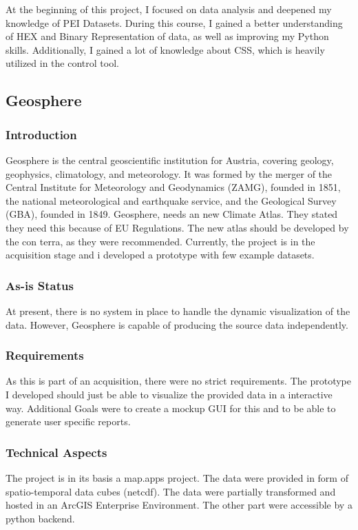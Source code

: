 \documentclass[11pt, titlepage, a4paper]{article}
\begin{document}
At the beginning of this project, I focused on data analysis and deepened my knowledge of PEI Datasets. During this course, I gained a better understanding of HEX and Binary Representation of data, as well as improving my Python skills.  Additionally, I gained a lot of knowledge about CSS, which is heavily utilized in the control tool.%

\subsection{Geosphere}
\subsubsection{Introduction}
Geosphere is the central geoscientific institution for Austria, covering geology, geophysics, climatology, and meteorology.  It was formed by the merger of the Central Institute for Meteorology and Geodynamics (ZAMG), founded in 1851, the national meteorological and earthquake service, and the Geological Survey (GBA), founded in 1849. 
Geosphere, needs an new Climate Atlas. They stated they need this because of EU Regulations. The new atlas should be developed by the con terra, as they were recommended. Currently, the project is in the acquisition stage and i developed a prototype with few example datasets.

\subsubsection{As-is Status}
At present, there is no system in place to handle the dynamic visualization of the data. However, Geosphere is capable of producing the source data independently. 
\subsubsection{Requirements}
As this is part of an acquisition, there were no strict requirements. The prototype I developed should just be able to visualize the provided data in a interactive way. Additional Goals were to create a mockup GUI for this and to be able to generate user specific reports. 
\subsubsection{Technical Aspects}
The project is in its basis a map.apps project. The data were provided in form of spatio-temporal data cubes (netcdf). The data were partially transformed and hosted in an ArcGIS Enterprise Environment. The other part were accessible by a python backend.
\end{document}
